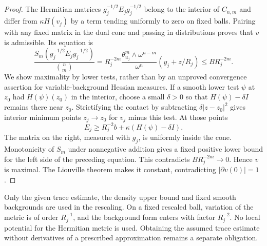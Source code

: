 \begin{proof}
The Hermitian matrices $g_j^{-1/2}E_jg_j^{-1/2}$ belong to the interior of $C_{n,m}$ and differ from $\kappa H(v_j)$ by a term tending uniformly to zero on fixed balls. Pairing with any fixed matrix in the dual cone and passing in distributions proves that $v$ is admissible.
Its equation is
\[
 \frac{S_m(g_j^{-1/2}E_jg_j^{-1/2})}{\binom nm}
   =R_j^{-2m}\frac{\theta_{u_j}^m\wedge\omega^{n-m}}{\omega^n}
      (y_j+z/R_j)\leq BR_j^{-2m}.
\]
We show maximality by lower tests, rather than by an unproved convergence assertion for variable-background Hessian measures. If a smooth lower test $\psi$ at $z_0$ had $H(\psi)(z_0)$ in the interior, choose a small $\delta>0$ so that $H(\psi)-\delta I$ remains there near $z_0$. Strictifying the contact by subtracting $\delta|z-z_0|^2$ gives interior minimum points $z_j\to z_0$ for $v_j$ minus this test. At those points
\[
 E_j\geq R_j^{-2}b+\kappa(H(\psi)-\delta I).
\]
The matrix on the right, measured with $g_j$, is uniformly inside the cone. Monotonicity of $S_m$ under nonnegative addition gives a fixed positive lower bound for the left side of the preceding equation. This contradicts $BR_j^{-2m}\to0$.
Hence $v$ is maximal. The Liouville theorem makes it constant, contradicting $|\partial v(0)|=1$.
\end{proof}

Only the given trace estimate, the density upper bound and fixed smooth backgrounds are used in the rescaling. On a fixed rescaled ball, variation of the metric is of order $R_j^{-1}$, and the background form enters with factor $R_j^{-2}$. No local potential for the Hermitian metric is used. Obtaining the assumed trace estimate without derivatives of a prescribed approximation remains a separate obligation.
